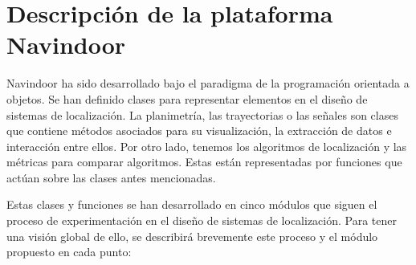 \section{Descripción de la plataforma Navindoor}\label{S3}
Navindoor ha sido desarrollado bajo el paradigma de la programación orientada a objetos. Se han definido clases para representar elementos en el diseño de sistemas de localización. La planimetría, las trayectorias o las señales son clases que contiene métodos asociados para su visualización, la extracción de datos e interacción entre ellos. Por otro lado, tenemos los algoritmos de localización y las métricas para comparar algoritmos. Estas están representadas por funciones que actúan sobre las clases antes mencionadas.

Estas clases y funciones se han desarrollado en cinco módulos que siguen el proceso de experimentación en el diseño de sistemas de localización. Para tener una visión global de ello, se describirá brevemente este proceso y el módulo propuesto en cada punto:

